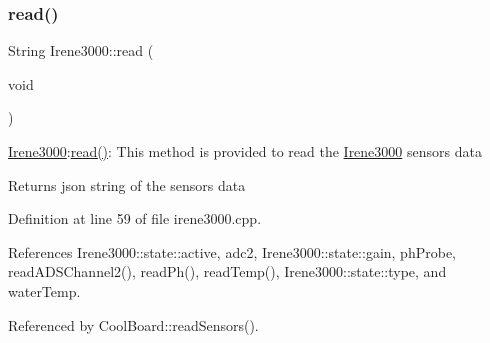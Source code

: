 \subsubsection{\texorpdfstring{read()}{read()}}
{\footnotesize\ttfamily String Irene3000\+::read (\begin{DoxyParamCaption}\item[{void}]{ }\end{DoxyParamCaption})}

\hyperlink{classIrene3000}{Irene3000}\+:\hyperlink{classIrene3000_a852a170feea994ea1df01c6b245b5d9a}{read()}\+: This method is provided to read the \hyperlink{classIrene3000}{Irene3000} sensors data

\begin{DoxyReturn}{Returns}
json string of the sensors data 
\end{DoxyReturn}


Definition at line 59 of file irene3000.\+cpp.



References Irene3000\+::state\+::active, adc2, Irene3000\+::state\+::gain, ph\+Probe, read\+A\+D\+S\+Channel2(), read\+Ph(), read\+Temp(), Irene3000\+::state\+::type, and water\+Temp.



Referenced by Cool\+Board\+::read\+Sensors().


